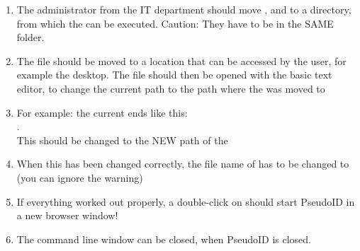 \begin{enumerate}
    
    \item The administrator from the IT department should move ,  and  to a directory, from which the  can be executed. Caution: They have to be in the SAME folder. 
    
    \item The  file should be moved to a location that can be accessed by the user, for example the desktop. The file should then be opened with the basic text editor, to change the current path to the path where the  was moved to
    \label{item:admin}
    
    \item For example: the current  ends like this: \\ . \\ This should be changed to the NEW path of the 
    
    \item When this has been changed correctly, the file name of  has to be changed to  (you can ignore the warning)
    
    \item If everything worked out properly, a double-click on  should start PseudoID in a new browser window!
    
    \item The command line window can be closed, when PseudoID is closed.
\end{enumerate} 


